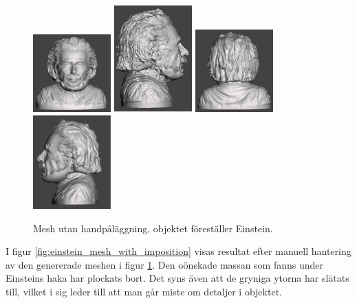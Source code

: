 \begin{figure}[H]
	\centering
	\includegraphics[width=30mm]{figures/ein_mesh_without_imposition1.png}
	\includegraphics[width=30mm]{figures/ein_mesh_without_imposition2.png}
	\includegraphics[width=30mm]{figures/ein_mesh_without_imposition3.png}
	\includegraphics[width=30mm]{figures/ein_mesh_without_imposition4.png}
	\caption{Mesh utan handpåläggning, objektet föreställer Einstein.}
	\label{fig:einstein_mesh_without_imposition}
\end{figure}

I figur \ref{fig:einstein_mesh_with_imposition} visas resultat efter manuell hantering av den genererade meshen i figur \ref{fig:einstein_mesh_without_imposition}. Den oönskade massan som fanns under Einsteins haka har plockats bort. Det syns även att de gryniga ytorna har slätats till, vilket i sig leder till att man går miste om detaljer i objektet.

